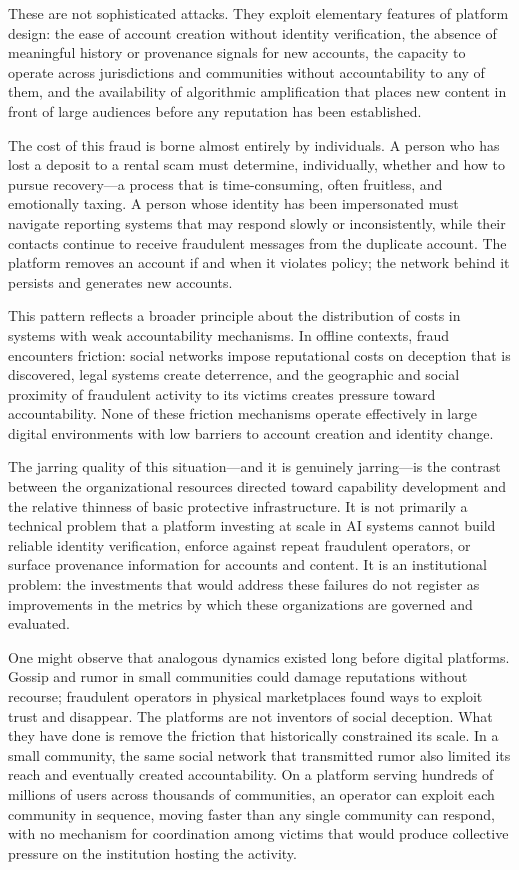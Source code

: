 \documentclass[12pt, a4paper]{article}
\begin{document}
These are not sophisticated attacks. They exploit elementary features of platform design: the ease of account creation without identity verification, the absence of meaningful history or provenance signals for new accounts, the capacity to operate across jurisdictions and communities without accountability to any of them, and the availability of algorithmic amplification that places new content in front of large audiences before any reputation has been established.

The cost of this fraud is borne almost entirely by individuals. A person who has lost a deposit to a rental scam must determine, individually, whether and how to pursue recovery---a process that is time-consuming, often fruitless, and emotionally taxing. A person whose identity has been impersonated must navigate reporting systems that may respond slowly or inconsistently, while their contacts continue to receive fraudulent messages from the duplicate account. The platform removes an account if and when it violates policy; the network behind it persists and generates new accounts.

This pattern reflects a broader principle about the distribution of costs in systems with weak accountability mechanisms. In offline contexts, fraud encounters friction: social networks impose reputational costs on deception that is discovered, legal systems create deterrence, and the geographic and social proximity of fraudulent activity to its victims creates pressure toward accountability. None of these friction mechanisms operate effectively in large digital environments with low barriers to account creation and identity change.

The jarring quality of this situation---and it is genuinely jarring---is the contrast between the organizational resources directed toward capability development and the relative thinness of basic protective infrastructure. It is not primarily a technical problem that a platform investing at scale in AI systems cannot build reliable identity verification, enforce against repeat fraudulent operators, or surface provenance information for accounts and content. It is an institutional problem: the investments that would address these failures do not register as improvements in the metrics by which these organizations are governed and evaluated.

One might observe that analogous dynamics existed long before digital platforms. Gossip and rumor in small communities could damage reputations without recourse; fraudulent operators in physical marketplaces found ways to exploit trust and disappear. The platforms are not inventors of social deception. What they have done is remove the friction that historically constrained its scale. In a small community, the same social network that transmitted rumor also limited its reach and eventually created accountability. On a platform serving hundreds of millions of users across thousands of communities, an operator can exploit each community in sequence, moving faster than any single community can respond, with no mechanism for coordination among victims that would produce collective pressure on the institution hosting the activity.
\end{document}
